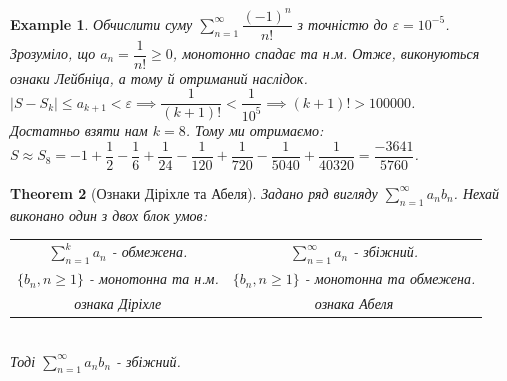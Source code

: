 \documentclass[a4paper, 10pt]{article}
\def\huge{\displaystyle}
\theoremstyle{theoremdd}
\newtheorem{theorem}{Theorem}[subsection]
\theoremstyle{theoremdd}
\theoremstyle{theoremdd}
\theoremstyle{theoremdd}
\newtheorem{example}[theorem]{Example}
\theoremstyle{theoremdd}
\theoremstyle{theoremdd}
\theoremstyle{theoremdd}
\theoremstyle{theoremdd}
\begin{document}
\begin{example}
Обчислити суму $\huge\sum_{n=1}^\infty \dfrac{(-1)^n}{n!}$ з точністю до $\varepsilon = 10^{-5}$.\\
Зрозуміло, що $a_n = \dfrac{1}{n!} \geq 0$, монотонно спадає та н.м. Отже, виконуються ознаки Лейбніца, а тому й отриманий наслідок.\\
$|S-S_k| \leq a_{k+1} < \varepsilon \implies \dfrac{1}{(k+1)!} < \dfrac{1}{10^5} \implies (k+1)! > 100000$.\\
Достатньо взяти нам $k = 8$. Тому ми отримаємо:\\
$S \approx S_8 = -1 + \dfrac{1}{2} - \dfrac{1}{6} + \dfrac{1}{24} - \dfrac{1}{120} + \dfrac{1}{720} - \dfrac{1}{5040} + \dfrac{1}{40320} = \dfrac{-3641}{5760}$.
\end{example}

\begin{theorem}[Ознаки Діріхле та Абеля]
Задано ряд вигляду $\huge \sum_{n=1}^{\infty} a_n b_n$. Нехай виконано один з двох блок умов:\\
\begin{tabular}{c | c}
$\huge\sum_{n=1}^k a_n$ - обмежена. & $\huge \sum_{n=1}^{\infty} a_n$ - збіжний. \\
$\{b_n, n \geq 1\}$ - монотонна та н.м. & $\{b_n, n \geq 1\}$ - монотонна та обмежена.\\
\textit{ознака Діріхле} & \textit{ознака Абеля}
\end{tabular} \\
Тоді $\huge \sum_{n=1}^{\infty} a_n b_n$ - збіжний.
\end{theorem}
\end{document}
